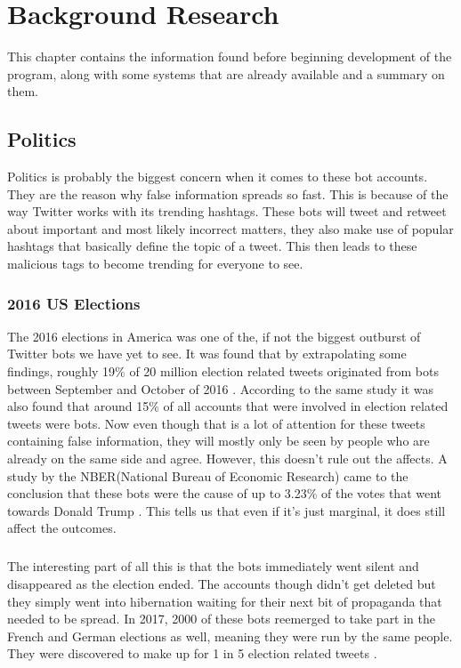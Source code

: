
\chapter{Background Research}
\label{Chapter2}

This chapter contains the information found before beginning development of the program, along with some systems that are already available and a summary on them. 

\section{Politics}
Politics is probably the biggest concern when it comes to these bot accounts. They are the reason why false information spreads so fast. This is because of the way Twitter works with its trending hashtags. These bots will tweet and retweet about important and most likely incorrect matters, they also make use of popular hashtags that basically define the topic of a tweet. This then leads to these malicious tags to become trending for everyone to see.

\subsection{2016 US Elections}
The 2016 elections in America was one of the, if not the biggest outburst of Twitter bots we have yet to see. It was found that by extrapolating some findings, roughly 19\% of 20 million election related tweets originated from bots between September and October of 2016 \cite{FM7090}. 
According to the same study it was also found that around 15\% of all accounts that were involved in election related tweets were bots. Now even though that is a lot of attention for these tweets containing false information, they will mostly only be seen by people who are already on the same side and agree. However, this doesn't rule out the affects. A study by the NBER(National Bureau of Economic Research) came to the conclusion that these bots were the cause of up to 3.23\% of the votes that went towards Donald Trump \cite{NBERw24631}. 
This tells us that even if it's just marginal, it does still affect the outcomes.
\paragraph{} The interesting part of all this is that the bots immediately went silent and disappeared as the election ended. The accounts though didn't get deleted but they simply went into hibernation waiting for their next bit of propaganda that needed to be spread. In 2017, 2000 of these bots reemerged to take part in the French and German elections as well, meaning they were run by the same people. They were discovered to make up for 1 in 5 election related tweets \cite{motherjonesbot}.

